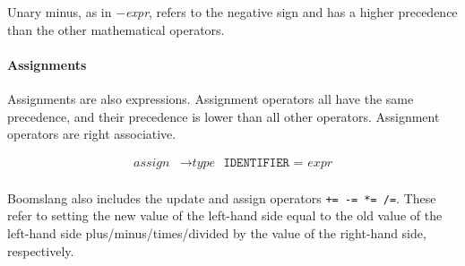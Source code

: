\documentclass{article}
\begin{document}
Unary minus, as in \(-\)\textit{expr}, refers to the negative sign and has a higher precedence than the other mathematical operators.

\paragraph{Assignments}
Assignments are also expressions. Assignment operators all have the same precedence, and their precedence is lower than all other operators. Assignment operators are right associative.

\label{sec:assign}
\begin{align*}
    \textit{assign} &\to \hyperref[sec:type]{\textit{type}} \text{ }  \texttt{IDENTIFIER} \texttt{ = } \hyperref[sec:expr]{\textit{expr}} \\
\end{align*}

Boomslang also includes the update and assign operators \texttt{+= -= *= /=}. These refer to setting the new value of the left-hand side equal to the old value of the left-hand side plus/minus/times/divided by the value of the right-hand side, respectively.
\end{document}
